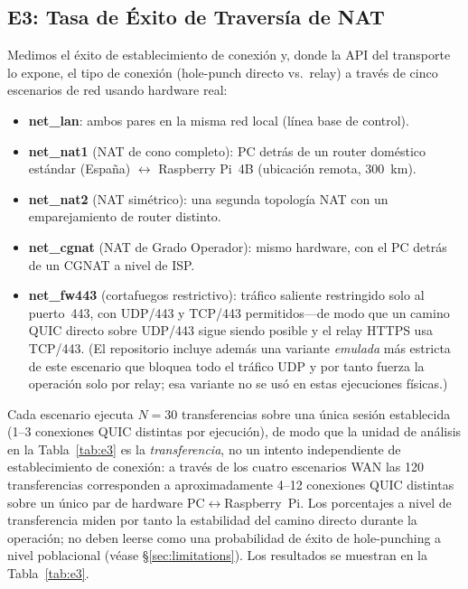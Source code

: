 \documentclass[journal]{IEEEtran}
\begin{document}
\subsection{E3: Tasa de Éxito de Traversía de NAT}
\label{sec:e3}

Medimos el éxito de establecimiento de conexión y, donde la API del transporte lo expone, el tipo de conexión (hole-punch directo vs.~relay) a través de cinco escenarios de red usando hardware real:

\begin{itemize}
    \item \textbf{net\_lan}: ambos pares en la misma red local (línea base de control).
    \item \textbf{net\_nat1} (NAT de cono completo): PC detrás de un router doméstico estándar (España) $\leftrightarrow$ Raspberry Pi~4B (ubicación remota, 300~km).
    \item \textbf{net\_nat2} (NAT simétrico): una segunda topología NAT con un emparejamiento de router distinto.
    \item \textbf{net\_cgnat} (NAT de Grado Operador): mismo hardware, con el PC detrás de un CGNAT a nivel de ISP.
    \item \textbf{net\_fw443} (cortafuegos restrictivo): tráfico saliente restringido solo al puerto~443, con UDP/443 y TCP/443 permitidos---de modo que un camino QUIC directo sobre UDP/443 sigue siendo posible y el relay HTTPS usa TCP/443. (El repositorio incluye además una variante \emph{emulada} más estricta de este escenario que bloquea todo el tráfico UDP y por tanto fuerza la operación solo por relay; esa variante no se usó en estas ejecuciones físicas.)
\end{itemize}

Cada escenario ejecuta $N{=}30$ transferencias sobre una única sesión establecida (1--3 conexiones QUIC distintas por ejecución), de modo que la unidad de análisis en la Tabla~\ref{tab:e3} es la \emph{transferencia}, no un intento independiente de establecimiento de conexión: a través de los cuatro escenarios WAN las 120 transferencias corresponden a aproximadamente 4--12 conexiones QUIC distintas sobre un único par de hardware PC$\leftrightarrow$Raspberry~Pi. Los porcentajes a nivel de transferencia miden por tanto la estabilidad del camino directo durante la operación; no deben leerse como una probabilidad de éxito de hole-punching a nivel poblacional (véase \S\ref{sec:limitations}). Los resultados se muestran en la Tabla~\ref{tab:e3}.
\end{document}
